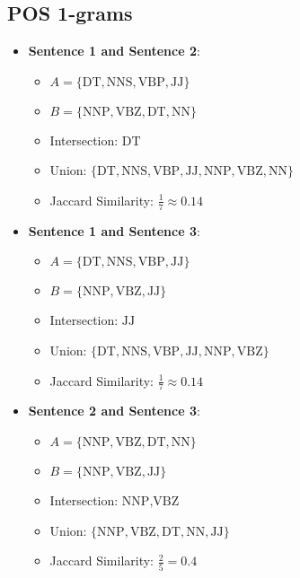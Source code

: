 \documentclass{article}
\begin{document}
\subsection*{POS 1-grams}
\begin{itemize}
    \item \textbf{Sentence 1 and Sentence 2}:
    \begin{itemize}
        \item \( A = \{ \text{DT}, \text{NNS}, \text{VBP}, \text{JJ} \} \)
        \item \( B = \{ \text{NNP}, \text{VBZ}, \text{DT}, \text{NN} \} \)
        \item Intersection: \( \text{DT} \)
        \item Union: \( \{ \text{DT}, \text{NNS}, \text{VBP}, \text{JJ}, \text{NNP}, \text{VBZ}, \text{NN} \} \)
        \item Jaccard Similarity: \( \frac{1}{7} \approx 0.14 \)
    \end{itemize}

    \item \textbf{Sentence 1 and Sentence 3}:
    \begin{itemize}
        \item \( A = \{ \text{DT}, \text{NNS}, \text{VBP}, \text{JJ} \} \)
        \item \( B = \{ \text{NNP}, \text{VBZ}, \text{JJ} \} \)
        \item Intersection: \( \text{JJ} \)
        \item Union: \( \{ \text{DT}, \text{NNS}, \text{VBP}, \text{JJ}, \text{NNP}, \text{VBZ} \} \)
        \item Jaccard Similarity: \( \frac{1}{7} \approx 0.14 \)
    \end{itemize}

    \item \textbf{Sentence 2 and Sentence 3}:
    \begin{itemize}
        \item \( A = \{ \text{NNP}, \text{VBZ}, \text{DT}, \text{NN} \} \)
        \item \( B = \{ \text{NNP}, \text{VBZ}, \text{JJ} \} \)
        \item Intersection: \( \text{NNP}, \text{VBZ} \)
        \item Union: \( \{ \text{NNP}, \text{VBZ}, \text{DT}, \text{NN}, \text{JJ} \} \)
        \item Jaccard Similarity: \( \frac{2}{5} = 0.4 \)
    \end{itemize}
\end{itemize}
\end{document}
